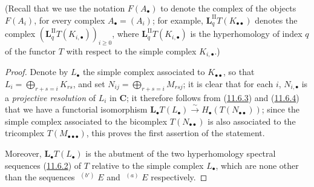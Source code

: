 (Recall that we use the notation $F(A_\bullet)$ to denote the
complex of the objects $F(A_i)$, for every complex $A_\bullet=(A_i)$; for
example, $\mathbf{L}_q^{\mathrm{II}}T(K_{\bullet\bullet})$ denotes the complex
$(\mathbf{L}_q^{\mathrm{II}}T(K_{i,\bullet}))_{i\geq0}$, where
$\mathbf{L}_q^{\mathrm{II}}T(K_{i,\bullet})$ is the hyperhomology of index $q$ of the
functor $T$ with respect to the simple complex $K_{i,\bullet}$.)

\begin{proof}
Denote by $L_\bullet$ the simple complex associated to
$K_{\bullet\bullet}$, so that $L_i=\bigoplus_{r+s=i}K_{rs}$,
and set $N_{ij}=\bigoplus_{r+s=i}M_{rsj}$;
it is clear that for each $i$, $N_{i,\bullet}$ is a \emph{projective
resolution} of $L_i$ in $\boldsymbol{C}$; it therefore follows from
(\hyperref[0.11.6.3]{11.6.3}) and
(\hyperref[0.11.6.4]{11.6.4}) that we have a functorial isomorphism $\mathbf{L}_\bullet T(L_\bullet)\xrightarrow{\sim} H_\bullet(T(N_{\bullet\bullet}))$;
since the simple complex associated to the bicomplex $T(N_{\bullet\bullet})$ is
also associated to the tricomplex $T(M_{\bullet\bullet\bullet})$, this proves
the first assertion of the statement.

Moreover, $\mathbf{L}_\bullet T(L_\bullet)$ is the abutment of the two hyperhomology
spectral sequences (\hyperref[0.11.6.2]{11.6.2}) of $T$
relative to the simple complex $L_\bullet$, which are none other than the
sequences $\mathop{}^{(b')}E$ and $\mathop{}^{(a)}E$ respectively.


\end{proof}
